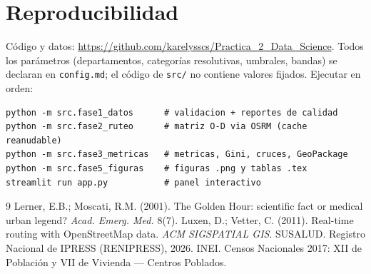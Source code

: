 \documentclass[11pt,a4paper]{article}
\begin{document}
\section*{Reproducibilidad}
C\'odigo y datos: \url{https://github.com/karelysscs/Practica_2_Data_Science}.
Todos los par\'ametros (departamentos, categor\'ias resolutivas, umbrales,
bandas) se declaran en \texttt{config.md}; el c\'odigo de \texttt{src/} no
contiene valores fijados. Ejecutar en orden:
\begin{verbatim}
python -m src.fase1_datos      # validacion + reportes de calidad
python -m src.fase2_ruteo      # matriz O-D via OSRM (cache reanudable)
python -m src.fase3_metricas   # metricas, Gini, cruces, GeoPackage
python -m src.fase5_figuras    # figuras .png y tablas .tex
streamlit run app.py           # panel interactivo
\end{verbatim}

\begin{thebibliography}{9}
 Lerner, E.B.; Moscati, R.M. (2001). The Golden Hour:
  scientific fact or medical urban legend? \emph{Acad. Emerg. Med.} 8(7).
 Luxen, D.; Vetter, C. (2011). Real-time routing with
  OpenStreetMap data. \emph{ACM SIGSPATIAL GIS}.
 SUSALUD. Registro Nacional de IPRESS (RENIPRESS), 2026.
 INEI. Censos Nacionales 2017: XII de Poblaci\'on y VII de
  Vivienda --- Centros Poblados.
\end{thebibliography}
\end{document}
